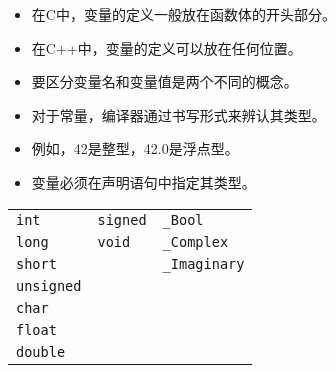 \begin{frame}
\begin{itemize}
\item 在C中，变量的定义一般放在函数体的开头部分。\\[0.1in]
\item 在C++中，变量的定义可以放在任何位置。\\[0.1in]  
\item
要区分变量名和变量值是两个不同的概念。
\end{itemize}

\begin{figure}
\centering
{}
\end{figure}

\end{frame}




\begin{frame}
\begin{itemize}
\item 
对于常量，编译器通过书写形式来辨认其类型。\\[0.1in]
\item[] 例如，42是整型，42.0是浮点型。\\[0.2in]
\item
变量必须在声明语句中指定其类型。
\end{itemize}
\end{frame}

\begin{frame}
\begin{table}
\centering
\begin{tabular}{p{2cm}|p{2cm}|p{2cm}}\hline
\lstinline|int| & \lstinline|signed| & \lstinline|_Bool| \\[0.05in]
\lstinline|long| & \lstinline|void| & \lstinline|_Complex| \\[0.05in]
\lstinline|short| & & \lstinline|_Imaginary|\\[0.05in]
\lstinline|unsigned| &&\\[0.05in]
\lstinline|char| &&\\[0.05in]
\lstinline|float| &&\\[0.05in]
\lstinline|double| &&\\\hline
\end{tabular}
\end{table}
\end{frame}

